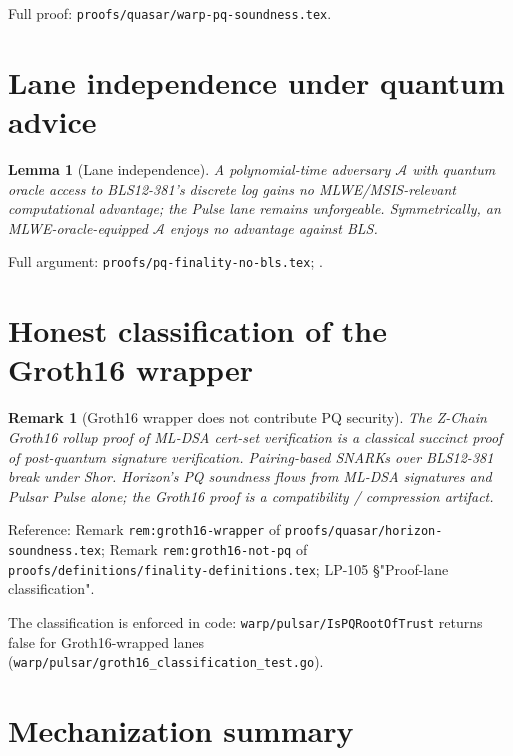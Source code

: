 \documentclass[11pt,a4paper]{article}
\newtheorem{lemma}[theorem]{Lemma}
\newtheorem{remark}{Remark}
\begin{document}
Full proof: \texttt{proofs/quasar/warp-pq-soundness.tex}.

\section{Lane independence under quantum advice}

\begin{lemma}[Lane independence]
A polynomial-time adversary $\mathcal{A}$ with quantum oracle access to BLS12-381's discrete log gains no MLWE/MSIS-relevant computational advantage; the Pulse lane remains unforgeable. Symmetrically, an MLWE-oracle-equipped $\mathcal{A}$ enjoys no advantage against BLS.
\end{lemma}

Full argument: \texttt{proofs/pq-finality-no-bls.tex}; \cite{pqfinalitynobls}.

\section{Honest classification of the Groth16 wrapper}

\begin{remark}[Groth16 wrapper does not contribute PQ security]
The Z-Chain Groth16 rollup proof of ML-DSA cert-set verification is a \emph{classical succinct proof of post-quantum signature verification}. Pairing-based SNARKs over BLS12-381 break under Shor. Horizon's PQ soundness flows from ML-DSA signatures and Pulsar Pulse alone; the Groth16 proof is a compatibility / compression artifact.
\end{remark}

Reference: Remark \texttt{rem:groth16-wrapper} of \texttt{proofs/quasar/horizon-soundness.tex}; Remark \texttt{rem:groth16-not-pq} of \texttt{proofs/definitions/finality-definitions.tex}; LP-105 \cite{lp105} \S"Proof-lane classification".

The classification is enforced in code: \texttt{warp/pulsar/IsPQRootOfTrust} returns false for Groth16-wrapped lanes (\texttt{warp/pulsar/groth16\_classification\_test.go}).

\section{Mechanization summary}
\end{document}

